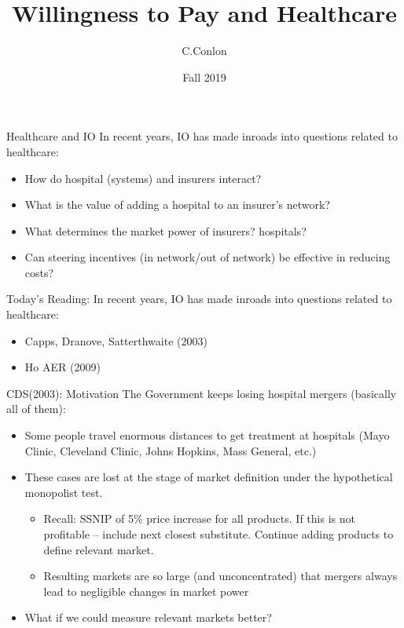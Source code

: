 \documentclass[xcolor=pdftex,dvipsnames,table,mathserif,aspectratio=169]{beamer}
\title [Healthcare and IO]{Willingness to Pay and Healthcare}
\author{C.Conlon }
\institute{Grad IO }
\date{Fall 2019}
\begin{document}
\begin{frame}
\titlepage
\end{frame}


\begin{frame}{Healthcare and IO}
In recent years, IO has made inroads into questions related to healthcare:
\begin{itemize}
\item How do hospital (systems) and insurers interact?
\item What is the value of adding a hospital to an insurer's network?
\item What determines the market power of insurers? hospitals?
\item Can steering incentives (in network/out of network) be effective in reducing costs?
\end{itemize}
\end{frame}

\begin{frame}{Today's Reading:}
In recent years, IO has made inroads into questions related to healthcare:
\begin{itemize}
\item Capps, Dranove, Satterthwaite (2003)
\item Ho AER (2009)
\end{itemize}
\end{frame}



\begin{frame}{CDS(2003): Motivation}
The Government keeps losing hospital mergers (basically all of them):
\begin{itemize}
\item Some people travel enormous distances to get treatment at hospitals (Mayo Clinic, Cleveland Clinic, Johns Hopkins, Mass General, etc.)
\item These cases are lost at the stage of \alert{market definition} under the \alert{hypothetical monopolist test}.
\begin{itemize}
\item Recall: SSNIP of 5\% price increase for all products. If this is not profitable -- include next closest substitute. Continue adding products to define relevant market.
\item Resulting markets are so large (and unconcentrated) that mergers always lead to negligible changes in market power
\end{itemize}
\item What if we could measure relevant markets better?
\end{itemize}
\end{frame} 
\end{document}
